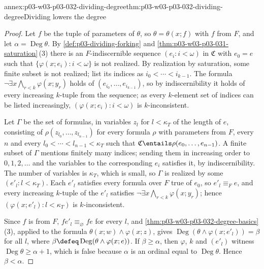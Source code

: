 \begin{annexitem}{annex:p03-w03-p03-032-dividing-degree}{thm:p03-w03-p03-032-dividing-degree}{Dividing lowers the degree}
\begin{proof}
Let \(f\) be the tuple of parameters of \(\theta\), so \(\theta=\theta(x;f)\)
with \(f\) from \(F\), and let \(\alpha=\operatorname{Deg}\theta\).  By
\cref{def:p03-dividing-forking} and
\cref{thm:p03-w03-p03-031-saturation}\,(3) there is an \(F\)-indiscernible
sequence \((e_i:i<\omega)\) in \(\mathfrak C\) with \(e_0=e\) such that
\(\{\varphi(x;e_i):i<\omega\}\) is not realized.  By realization by
saturation, some finite subset is not realized; list its indices as
\(i_0<\cdots<i_{k-1}\).  The formula
\(\neg\exists x\bigwedge_{r<k}\varphi(x;y_r)\) holds of
\((e_{i_0},\ldots,e_{i_{k-1}})\), so by indiscernibility it holds of every
increasing \(k\)-tuple from the sequence; as every \(k\)-element set of
indices can be listed increasingly, \((\varphi(x;e_i):i<\omega)\) is
\(k\)-inconsistent.

Let \(\Gamma\) be the set of formulas, in variables \(z_l\) for
\(l<\kappa_T\) of the length of \(e\), consisting of
\(\rho(z_{l_0},\ldots,z_{l_{n-1}})\) for every formula \(\rho\) with
parameters from \(F\), every \(n\) and every \(l_0<\cdots<l_{n-1}<\kappa_T\)
such that \(\mathfrak C\entails\rho(e_0,\ldots,e_{n-1})\).  A finite subset of
\(\Gamma\) mentions finitely many indices; sending them in increasing order
to \(0,1,2,\ldots\) and the variables to the corresponding \(e_i\) satisfies
it, by indiscernibility.  The number of variables is \(\kappa_T\), which is
small, so \(\Gamma\) is realized by some \((e'_l:l<\kappa_T)\).  Each
\(e'_l\) satisfies every formula over \(F\) true of \(e_0\), so
\(e'_l\equiv_F e\), and every increasing \(k\)-tuple of the \(e'_l\)
satisfies \(\neg\exists x\bigwedge_{r<k}\varphi(x;y_r)\); hence
\((\varphi(x;e'_l):l<\kappa_T)\) is \(k\)-inconsistent.

Since \(f\) is from \(F\), \(fe'_l\equiv_\varnothing fe\) for every \(l\), and
\cref{thm:p03-w03-p03-032-degree-basics}\,(3), applied to the formula
\(\theta(x;w)\wedge\varphi(x;z)\), gives
\(\operatorname{Deg}(\theta\wedge\varphi(x;e'_l))=\beta\) for all \(l\),
where \(\beta\defeq\operatorname{Deg}(\theta\wedge\varphi(x;e))\).  If
\(\beta\geq\alpha\), then \(\varphi\), \(k\) and \((e'_l)\) witness
\(\operatorname{Deg}\theta\geq\alpha+1\), which is false because \(\alpha\)
is an ordinal equal to \(\operatorname{Deg}\theta\).  Hence \(\beta<\alpha\).
\end{proof}
\end{annexitem}

